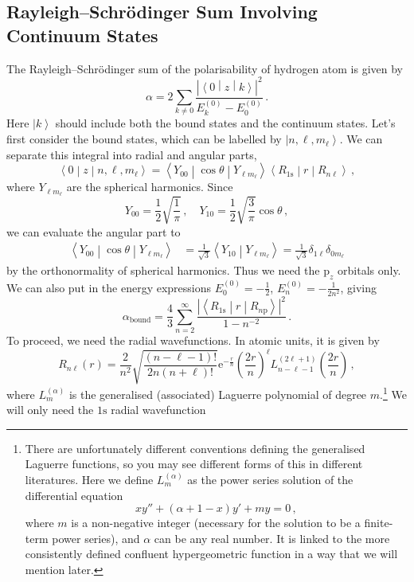 \documentclass{article}
\theoremstyle{plain}\theoremheaderfont{\normalfont\itshape}\theorembodyfont{\rmfamily}\theoremseparator{.}\newtheorem*{rem}{Remark}\newtheorem*{ex}{Example}\newtheorem*{proof}{Proof}\newtheorem*{altp}{Alternative proof}
\theoremstyle{plain}\theoremheaderfont{\normalfont\bfseries}\theorembodyfont{\rmfamily}\theoremseparator{.}\newtheorem{thm}{Theorem}[section]\newtheorem{lem}[thm]{Lemma}\newtheorem{prop}[thm]{Proposition}\newtheorem*{cor}{Corollary}\newtheorem{defn}[thm]{Definition}\newtheorem{clm}[thm]{Claim}\newtheorem{clminproof}{Claim}
\theoremstyle{break}\theoremheaderfont{\normalfont\itshape}\theorembodyfont{\rmfamily}\theoremseparator{.\medskip}\newtheorem*{proofskip}{Proof}\newtheorem*{exs}{Examples}\newtheorem*{rems}{Remarks}
\theoremstyle{break}\theoremheaderfont{\normalfont\bfseries}\theorembodyfont{\rmfamily}\theoremseparator{.\medskip}\newtheorem{lemskip}[thm]{Lemma}\newtheorem{defnskip}[thm]{Definition}\newtheorem{propskip}[thm]{Proposition}\newtheorem{thmskip}[thm]{Theorem}
\numberwithin{equation}{section}
\newcommand{\ee}{\mathrm{e}}
\newcommand{\ket}[1]{\left| #1 \right\rangle}
\newcommand{\braket}[2]{\left\langle #1 \middle| #2 \right\rangle}
\newcommand{\mel}[3]{\left\langle #1 \middle| #2 \middle| #3 \right\rangle}
\newcommand{\abs}[1]{\left| #1 \right|}
\begin{document}
    \subsection{Rayleigh--Schr\"{o}dinger Sum Involving Continuum States}
    The Rayleigh--Schr\"{o}dinger sum of the polarisability of hydrogen atom is given by
    \begin{equation}
        \alpha=2\sum_{k\ne 0}\frac{\abs{\mel{0}{z}{k}}^2}{E_k^{(0)}-E_0^{(0)}}\,.
    \end{equation}
    Here \(\ket{k}\) should include both the bound states and the continuum states. Let's first consider the bound states, which can be labelled by \(\ket{n,\ell,m_\ell}\). We can separate this integral into radial and angular parts,
    \begin{equation}
        \mel{0}{z}{n,\ell,m_\ell}=\mel{Y_{00}}{\cos\theta}{Y_{\ell m_\ell}}\mel{R_{1\mathrm{s}}}{r}{R_{n\ell}}\,,
    \end{equation}
    where \(Y_{\ell m_\ell}\) are the spherical harmonics. Since
    \begin{equation}
        Y_{00}=\frac{1}{2}\sqrt{\frac{1}{\pi}}\,,\quad Y_{10}=\frac{1}{2}\sqrt{\frac{3}{\pi}}\cos\theta\,,
    \end{equation}
    we can evaluate the angular part to
    \begin{align}
        \mel{Y_{00}}{\cos\theta}{Y_{\ell m_\ell}}&=\frac{1}{\sqrt{3}}\braket{Y_{10}}{Y_{\ell m_\ell}}=\frac{1}{\sqrt{3}}\delta_{1\ell}\delta_{0 m_\ell}
    \end{align}
    by the orthonormality of spherical harmonics. Thus we need the \(\mathrm{p}_z\) orbitals only. We can also put in the energy expressions \(E_0^{(0)}=-\frac{1}{2}\), \(E_n^{(0)}=-\frac{1}{2n^2}\), giving
    \begin{equation}
        \alpha_{\text{bound}}=\frac{4}{3}\sum_{n=2}^{\infty}\frac{\abs{\mel{R_{1\mathrm{s}}}{r}{R_{n\mathrm{p}}}}^2}{1-n^{-2}}\,.
    \end{equation}
    To proceed, we need the radial wavefunctions. In atomic units, it is given by
    \begin{equation}
        R_{n\ell}(r)=\frac{2}{n^2}\sqrt{\frac{(n-\ell-1)!}{2n (n+\ell)!}}\ee^{-\frac{r}{n}}\left(\frac{2r}{n}\right)^{\ell}L_{n-\ell-1}^{(2\ell+1)}\left(\frac{2r}{n}\right)\,,
    \end{equation}
    where \(L_m^{(\alpha)}\) is the generalised (associated) Laguerre polynomial of degree \(m\).\footnote{There are unfortunately different conventions defining the generalised Laguerre functions, so you may see different forms of this in different literatures. Here we define \(L_m^{(\alpha)}\) as the power series solution of the differential equation
    \begin{equation}
        xy''+(\alpha+1-x)y'+my=0\,,
    \end{equation}
    where \(m\) is a non-negative integer (necessary for the solution to be a finite-term power series), and \(\alpha\) can be any real number. It is linked to the more consistently defined confluent hypergeometric function in a way that we will mention later.} We will only need the \(1\mathrm{s}\) radial wavefunction
\end{document}

